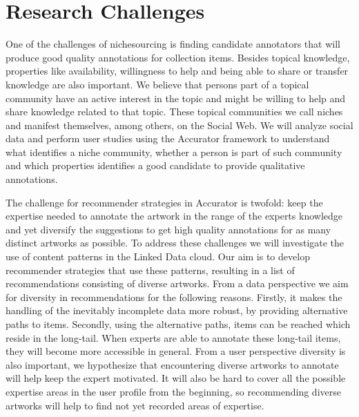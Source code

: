 \section{Research Challenges}\label{use_case}

One of the challenges of nichesourcing is finding candidate annotators that will produce good quality annotations for collection items. Besides topical knowledge, properties like availability, willingness to help and being able to share or transfer knowledge are also important. We believe that persons part of a topical community have an active interest in the topic and might be willing to help and share knowledge related to that topic. These topical communities we call niches and manifest themselves, among others, on the Social Web. We will analyze social data and perform user studies using the Accurator framework to understand what identifies a niche community, whether a person is part of such community and which properties identifies a good candidate to provide qualitative annotations. 

The challenge for recommender strategies in Accurator is twofold: keep the expertise needed to annotate the artwork in the range of the experts knowledge and yet diversify the suggestions to get high quality annotations for as many distinct artworks as possible. To address these challenges we will investigate the use of content patterns in the Linked Data cloud. Our aim is to develop recommender strategies that use these patterns, resulting in a list of recommendations consisting of diverse artworks.
From a data perspective we aim for diversity in recommendations for the following reasons. Firstly, it makes the handling of the inevitably incomplete data more robust, by providing alternative paths to items. Secondly, using the alternative paths, items can be reached which reside in the long-tail. When experts are able to annotate these long-tail items, they will become more accessible in general.
From a user perspective diversity is also important, we hypothesize that encountering diverse artworks to annotate will help keep the expert motivated. It will also be hard to cover all the possible expertise areas in the user profile from the beginning, so recommending diverse artworks will help to find not yet recorded areas of expertise.

